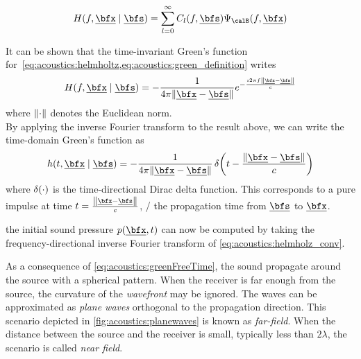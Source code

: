 \begin{equation}
    \label{eq:acoustics:eigenfunction}
    H(f, \positionMicrophone \mid \positionSource) =
        \sum_{l=0}^\infty
            C_l(f, \positionSource)
            \Psi_\boundariesConditions(f, \positionMicrophone)
\end{equation}

It can be shown \cite{Kutruff} that the time-invariant Green's function for~\cref{eq:acoustics:helmholtz,eq:acoustics:green_definition} writes
\begin{equation}
    \label{eq:acoustics:greenFreeFreq}
    H(f, \positionMicrophone \mid \positionSource) = - \frac{1}{4 \pi \norm{\positionMicrophone - \positionSource}} e^{- \frac{\Ii 2 \pi f \norm{\positionMicrophone - \positionSource}}{\speedOfSound}}
\end{equation}
where $\norm{\cdot}$ denotes the Euclidean norm.
\\By applying the inverse Fourier transform to the result above, we can write the time-domain Green's function as
\begin{equation}
    \label{eq:acoustics:greenFreeTime}
    h(t, \positionMicrophone \mid \positionSource) =
        - \frac{1}{4 \pi \norm{\positionMicrophone - \positionSource}}
        \diracOf{t - \frac{\norm{\positionMicrophone - \positionSource}}{\speedOfSound}}
\end{equation}
where $\diracOf{\cdot}$ is the time-directional Dirac delta function.
This corresponds to a pure impulse at time $t = \tfrac{\norm{\positionMicrophone - \positionSource}}{\speedOfSound}$,
\ie/ the propagation time from $\positionSource$ to $\positionMicrophone$.

 the initial sound pressure $\pressureSpaceTime$ can now be computed by taking the frequency-directional inverse Fourier transform of \cref{eq:acoustics:helmholz_conv}.

As a consequence of \cref{eq:acoustics:greenFreeTime}, the sound propagate around the source with a spherical pattern.
When the receiver is far enough from the source, the curvature of the \textit{wavefront} may be ignored.
The waves can be approximated as \textit{plane waves} orthogonal to the propagation direction.
This scenario depicted in \cref{fig:acoustics:planewaves} is known as \textit{far-field}.
When the distance between the source and the receiver is small, typically less than $2\lambda$, the scenario is called \textit{near field}.

